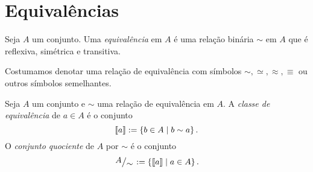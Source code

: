 \section{Equivalências}

\begin{definition}
	Seja $A$ um conjunto. Uma \emph{equivalência} em $A$ é uma relação binária $\sim$ em $A$ que é reflexiva, simétrica e transitiva.
\end{definition}

Costumamos denotar uma relação de equivalência com símbolos $\sim, \simeq, \approx, \equiv$ ou outros símbolos semelhantes.

\begin{definition}
	Seja $A$ um conjunto e $\sim$ uma relação de equivalência em $A$. A \emph{classe de equivalência} de $a \in A$ é o conjunto
	\begin{equation*}
	\left\llbracket{a}\right\rrbracket := \left\{{b \in A}\;\middle\vert\;{b \sim a}\right\}.
	\end{equation*}
	O \emph{conjunto quociente} de $A$ por $\sim$ é o conjunto
	\begin{equation*}
	\quo{A}{\sim} := \set{\cla{a}}{a \in A}.
	\end{equation*}
\end{definition}

